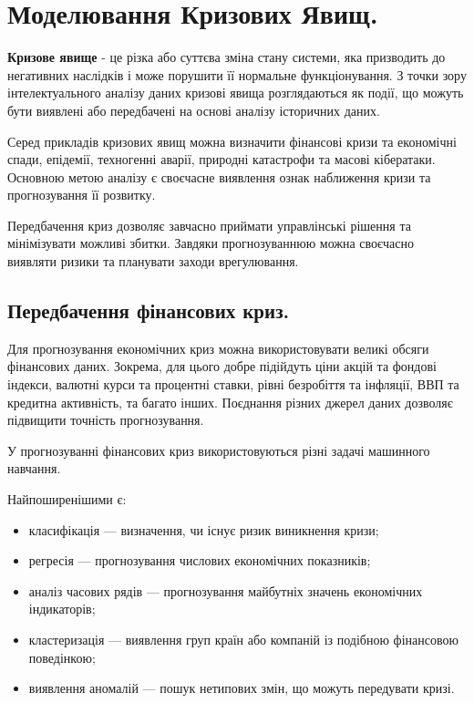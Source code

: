 \chapter{Моделювання Кризових Явищ.}

\textbf{Кризове явище} - це різка або суттєва зміна стану системи, яка призводить до негативних наслідків і може порушити її нормальне функціонування. З точки зору інтелектуального аналізу даних кризові явища розглядаються як події, що можуть бути виявлені або передбачені на основі аналізу історичних даних.

Серед прикладів кризових явищ можна визначити фінансові кризи та економічні спади, епідемії, техногенні аварії, природні катастрофи та масові кібератаки. Основною метою аналізу є своєчасне виявлення ознак наближення кризи та прогнозування її розвитку.

Передбачення криз дозволяє завчасно приймати управлінські рішення та мінімізувати можливі збитки. Завдяки прогнозуваннюю можна своєчасно виявляти ризики та планувати заходи врегулювання.

\section{Передбачення фінансових криз.}

Для прогнозування економічних криз можна використовувати великі обсяги фінансових даних. Зокрема, для цього добре підійдуть ціни акцій та фондові індекси, валютні курси та процентні ставки, рівні безробіття та інфляції, ВВП та кредитна активність, та багато інших. Поєднання різних джерел даних дозволяє підвищити точність прогнозування.

У прогнозуванні фінансових криз використовуються різні задачі машинного навчання.

Найпоширенішими є:

\begin{itemize}
\item класифікація — визначення, чи існує ризик виникнення кризи;
\item регресія — прогнозування числових економічних показників;
\item аналіз часових рядів — прогнозування майбутніх значень економічних індикаторів;
\item кластеризація — виявлення груп країн або компаній із подібною фінансовою поведінкою;
\item виявлення аномалій — пошук нетипових змін, що можуть передувати кризі.
\end{itemize}

